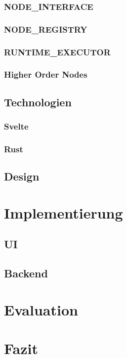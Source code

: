 \documentclass[ngerman]{article}
\begin{document}
\subsubsection{NODE\_INTERFACE}
\subsubsection{NODE\_REGISTRY}
\subsubsection{RUNTIME\_EXECUTOR}

\subsubsection{Higher Order Nodes}
\label{sec:HON}

\subsection{Technologien}
\subsubsection{Svelte}
\subsubsection{Rust}
\subsection{Design}

\section{Implementierung}
\subsection{UI}
\subsection{Backend}

\section{Evaluation}
\section{Fazit}
\end{document}
